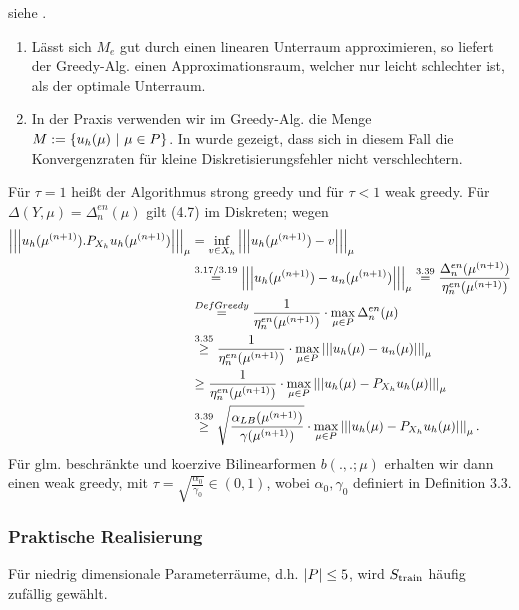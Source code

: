  siehe \cite{Binetal2011}.

\begin{enumerate}[(1)]
	\item Lässt sich $M_e$ gut durch einen linearen Unterraum approximieren, so liefert der Greedy-Alg. einen Approximationsraum, welcher nur leicht schlechter ist, als der optimale Unterraum.
	\item In der Praxis verwenden wir im Greedy-Alg. die Menge $M:=\left\{u_h(\mu)~|~ \mu \in P\right\}$.
	In \cite{Binetal2011} wurde gezeigt, dass sich in diesem Fall die Konvergenzraten für kleine Diskretisierungsfehler nicht verschlechtern.
\end{enumerate}

Für $\tau = 1$ heißt der Algorithmus strong greedy und für $\tau <1$ weak greedy.
Für $\Delta(Y,\mu)= \Delta_n^{en}(\mu)$ gilt (4.7) im Diskreten; wegen
\begin{align*}
\left|\left|\left|u_h(\mu^{(n+1)}).P_{X_h} u_h(\mu^{(n+1)})\right|\right|\right|_\mu &= \inf\limits_{v\in X_h} \left|\left|\left|u_h(\mu^{(n+1)})-v\right|\right|\right|_\mu\\
&\stackrel{3.17/3.19}{=} \left|\left|\left|u_h(\mu^{(n+1)})-u_n(\mu^{(n+1)})\right|\right|\right|_\mu \stackrel{3.39}{=} \frac{\Delta_n^{en}(\mu^{(n+1)})}{\eta_n^{en}(\mu^{(n+1)})}\\
&\stackrel{Def Greedy}{=} \frac{1}{\eta_n^{en}(\mu^{(n+1)})}\cdot \max\limits_{\mu\in P} \Delta_n^{en}(\mu)\\
&\stackrel{3.35}{\ge} \frac{1}{\eta_n^{en}(\mu^{(n+1)})}\cdot \max\limits_{\mu\in P} \left|\left|\left|u_h(\mu)-u_n(\mu)\right|\right|\right|_\mu\\
&\ge \frac{1}{\eta_n^{en}(\mu^{(n+1)})}\cdot \max\limits_{\mu\in P} \left|\left|\left|u_h(\mu)-P_{X_h} u_h(\mu)\right|\right|\right|_\mu\\
&\stackrel{3.39}{\ge} \sqrt{\frac{\alpha_{LB}(\mu^{(n+1)})}{\gamma(\mu^{(n+1)})}} \cdot \max\limits_{\mu\in P} \left|\left|\left|u_h(\mu)-P_{X_h} u_h(\mu)\right|\right|\right|_\mu.
\end{align*}
Für glm. beschränkte und koerzive Bilinearformen $b(.,.;\mu)$ erhalten wir dann einen weak greedy, mit $\tau = \sqrt{\frac{\alpha_0}{\gamma_0}}\in (0,1)$, wobei $\alpha_0,\gamma_0$ definiert in Definition 3.3.

\subsubsection{Praktische Realisierung}

Für niedrig dimensionale Parameterräume, d.h. $\left\vert P\right\vert\le 5$, wird $S_{\operatorname{train}}$ häufig zufällig gewählt.

